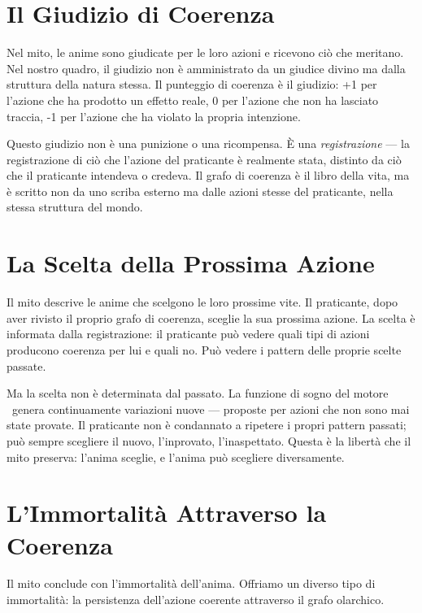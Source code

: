 \section{Il Giudizio di Coerenza}

Nel mito, le anime sono giudicate per le loro azioni e ricevono ci\`o che
meritano. Nel nostro quadro, il giudizio non \`e amministrato da un
giudice divino ma dalla struttura della natura stessa. Il punteggio di
coerenza \`e il giudizio: +1 per l'azione che ha prodotto un effetto
reale, 0 per l'azione che non ha lasciato traccia, -1 per l'azione che
ha violato la propria intenzione.

Questo giudizio non \`e una punizione o una ricompensa. \`E una
\emph{registrazione} --- la registrazione di ci\`o che l'azione del
praticante \`e realmente stata, distinto da ci\`o che il praticante
intendeva o credeva. Il grafo di coerenza \`e il libro della vita, ma
\`e scritto non da uno scriba esterno ma dalle azioni stesse del
praticante, nella stessa struttura del mondo.

\section{La Scelta della Prossima Azione}

Il mito descrive le anime che scelgono le loro prossime vite. Il
praticante, dopo aver rivisto il proprio grafo di coerenza, sceglie la
sua prossima azione. La scelta \`e informata dalla registrazione: il
praticante pu\`o vedere quali tipi di azioni producono coerenza per lui
e quali no. Pu\`o vedere i pattern delle proprie scelte passate.

Ma la scelta non \`e determinata dal passato. La funzione di sogno del
motore \physis\ genera continuamente variazioni nuove --- proposte per
azioni che non sono mai state provate. Il praticante non \`e condannato
a ripetere i propri pattern passati; pu\`o sempre scegliere il nuovo,
l'inprovato, l'inaspettato. Questa \`e la libert\`a che il mito preserva:
l'anima sceglie, e l'anima pu\`o scegliere diversamente.

\section{L'Immortalit\`a Attraverso la Coerenza}

Il mito conclude con l'immortalit\`a dell'anima. Offriamo un diverso tipo
di immortalit\`a: la persistenza dell'azione coerente attraverso il grafo
olarchico.

